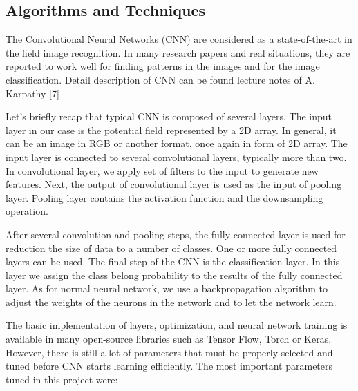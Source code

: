 \documentclass{article}
\begin{document}
\subsection{Algorithms and
Techniques}\label{algorithms-and-techniques}

The Convolutional Neural Networks (CNN) are considered as a
state-of-the-art in the field image recognition. In many research papers
and real situations, they are reported to work well for finding patterns
in the images and for the image classification. Detail description of
CNN can be found lecture notes of A. Karpathy {[}7{]}

Let's briefly recap that typical CNN is composed of several layers. The
input layer in our case is the potential field represented by a 2D
array. In general, it can be an image in RGB or another format, once
again in form of 2D array. The input layer is connected to several
convolutional layers, typically more than two. In convolutional layer,
we apply set of filters to the input to generate new features. Next, the
output of convolutional layer is used as the input of pooling layer.
Pooling layer contains the activation function and the downsampling
operation.

After several convolution and pooling steps, the fully connected layer
is used for reduction the size of data to a number of classes. One or
more fully connected layers can be used. The final step of the CNN is
the classification layer. In this layer we assign the class belong
probability to the results of the fully connected layer. As for normal
neural network, we use a backpropagation algorithm to adjust the weights
of the neurons in the network and to let the network learn.

The basic implementation of layers, optimization, and neural network
training is available in many open-source libraries such as Tensor Flow,
Torch or Keras. However, there is still a lot of parameters that must be
properly selected and tuned before CNN starts learning efficiently. The
most important parameters tuned in this project were:
\end{document}

